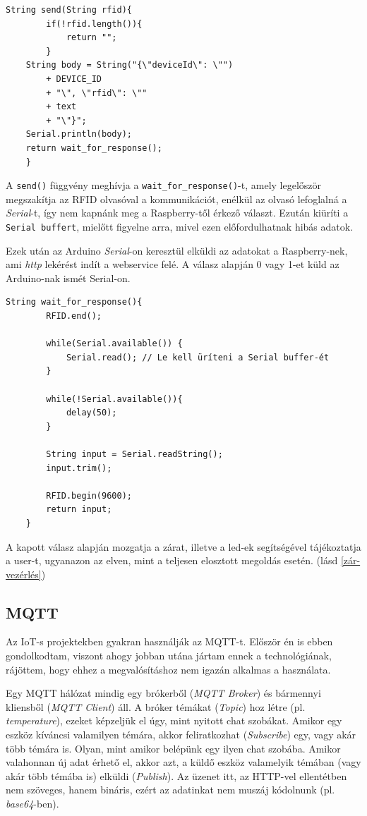 \documentclass[
]{thesis-ekf}
\theoremstyle{definition}
\theoremstyle{remark}
\begin{document}
\begin{lstlisting}[caption={send() függvény}]
    String send(String rfid){
        if(!rfid.length()){
            return "";
        }
    String body = String("{\"deviceId\": \"") 
        + DEVICE_ID 
        + "\", \"rfid\": \"" 
        + text
        + "\"}";
    Serial.println(body);
    return wait_for_response();
    }
\end{lstlisting}

A \texttt{send()} függvény meghívja a \texttt{wait\_for\_response()}-t, amely legelőször megszakítja az RFID olvasóval a kommunikációt, enélkül az olvasó lefoglalná a \emph{Serial}-t, így nem kapnánk meg a Raspberry-től érkező választ. Ezután kiüríti a \texttt{Serial buffert}, mielőtt figyelne arra, mivel ezen előfordulhatnak hibás adatok.

Ezek után az Arduino \emph{Serial}-on keresztül elküldi az adatokat a Raspberry-nek, ami \emph{http} lekérést indít a webservice felé. A válasz alapján 0 vagy 1-et küld az Arduino-nak ismét Serial-on.

\begin{lstlisting}[caption={wait\_for\_response() függvény}]
    String wait_for_response(){
        RFID.end(); 
        
        while(Serial.available()) {
            Serial.read(); // Le kell üríteni a Serial buffer-ét
        }
        
        while(!Serial.available()){
            delay(50);
        }

        String input = Serial.readString();
        input.trim();

        RFID.begin(9600);
        return input;
    }
\end{lstlisting}

A kapott válasz alapján mozgatja a zárat, illetve a led-ek segítségével tájékoztatja a user-t, ugyanazon az elven, mint a teljesen elosztott megoldás esetén. (lásd \ref{zár-vezérlés})

\subsection{MQTT}
Az IoT-s projektekben gyakran használják az MQTT-t. Először én is ebben gondolkodtam, viszont ahogy jobban utána jártam ennek a technológiának, rájöttem, hogy ehhez a megvalósításhoz nem igazán alkalmas a használata.

Egy MQTT hálózat mindig egy brókerből (\emph{MQTT Broker}) és bármennyi kliensből (\emph{MQTT Client}) áll. A bróker témákat (\emph{Topic}) hoz létre (pl. \emph{temperature}), ezeket képzeljük el úgy, mint nyitott chat szobákat. Amikor egy eszköz kíváncsi valamilyen témára, akkor feliratkozhat (\emph{Subscribe}) egy, vagy akár több témára is. Olyan, mint amikor belépünk egy ilyen chat szobába. Amikor valahonnan új adat érhető el, akkor azt, a küldő eszköz valamelyik témában (vagy akár több témába is) elküldi (\emph{Publish}). Az üzenet itt, az HTTP-vel ellentétben nem szöveges, hanem bináris, ezért az adatinkat nem muszáj kódolnunk (pl. \emph{base64}-ben). \cite{mqtt}
\end{document}

